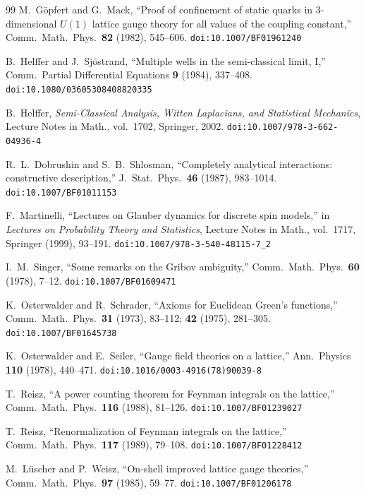 \documentclass[11pt]{article}
\theoremstyle{definition}
\begin{document}
\begin{thebibliography}{99}
 M.~G\"opfert and G.~Mack,
  ``Proof of confinement of static quarks in 3-dimensional
  $U(1)$ lattice gauge theory for all values of the
  coupling constant,''
  Comm.\ Math.\ Phys.\ \textbf{82} (1982), 545--606.
  \texttt{doi:10.1007/BF01961240}

 B.~Helffer and J.~Sj\"ostrand,
  ``Multiple wells in the semi-classical limit, I,''
  Comm.\ Partial Differential Equations \textbf{9}
  (1984), 337--408.
  \texttt{doi:10.1080/03605308408820335}

 B.~Helffer,
  \emph{Semi-Classical Analysis, Witten Laplacians,
  and Statistical Mechanics},
  Lecture Notes in Math., vol.~1702, Springer, 2002.
  \texttt{doi:10.1007/978-3-662-04936-4}

 R.~L.~Dobrushin and
  S.~B.~Shlosman,
  ``Completely analytical interactions:
  constructive description,''
  J.~Stat.\ Phys.\ \textbf{46} (1987), 983--1014.
  \texttt{doi:10.1007/BF01011153}

 F.~Martinelli,
  ``Lectures on Glauber dynamics for discrete spin
  models,''
  in \emph{Lectures on Probability Theory and Statistics},
  Lecture Notes in Math., vol.~1717, Springer (1999),
  93--191.
  \texttt{doi:10.1007/978-3-540-48115-7\_2}

 I.~M.~Singer,
  ``Some remarks on the Gribov ambiguity,''
  Comm.\ Math.\ Phys.\ \textbf{60} (1978), 7--12.
  \texttt{doi:10.1007/BF01609471}

 K.~Osterwalder and
  R.~Schrader,
  ``Axioms for Euclidean Green's functions,''
  Comm.\ Math.\ Phys.\ \textbf{31} (1973), 83--112;
  \textbf{42} (1975), 281--305.
  \texttt{doi:10.1007/BF01645738}

 K.~Osterwalder and
  E.~Seiler,
  ``Gauge field theories on a lattice,''
  Ann.\ Physics \textbf{110} (1978), 440--471.
  \texttt{doi:10.1016/0003-4916(78)90039-8}

 T.~Reisz,
  ``A power counting theorem for Feynman integrals
  on the lattice,''
  Comm.\ Math.\ Phys.\ \textbf{116} (1988), 81--126.
  \texttt{doi:10.1007/BF01239027}

 T.~Reisz,
  ``Renormalization of Feynman integrals on the lattice,''
  Comm.\ Math.\ Phys.\ \textbf{117} (1989), 79--108.
  \texttt{doi:10.1007/BF01228412}

 M.~L\"uscher and P.~Weisz,
  ``On-shell improved lattice gauge theories,''
  Comm.\ Math.\ Phys.\ \textbf{97} (1985), 59--77.
  \texttt{doi:10.1007/BF01206178}


\end{thebibliography}
\end{document}

